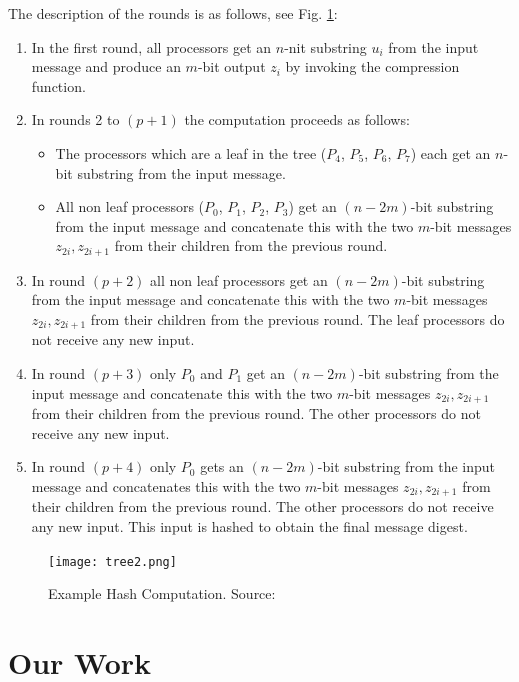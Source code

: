 \documentclass[letterpaper]{article}
\begin{document}
The description of the rounds is as follows, see Fig. \ref{fig:tree2}:
\begin{enumerate}
\item In the first round, all processors get an $n$-nit substring $u_i$ from the input message and produce an $m$-bit output $z_i$ by invoking the compression function.
\item In rounds 2 to $(p+1)$ the computation proceeds as follows:
\begin{itemize}
\item The processors which are a leaf in the tree ($P_4$, $P_5$, $P_6$, $P_7$) each get an $n$-bit substring from the input message.
\item All non leaf processors ($P_0$, $P_1$, $P_2$, $P_3$) get an $(n-2m)$-bit substring from the input message and concatenate this with the two $m$-bit messages $z_{2i}, z_{2i+1}$ from their children from the previous round.
\end{itemize}

\item  In round $(p+2)$ all non leaf processors get an  $(n-2m)$-bit substring from the input message and concatenate this with the two $m$-bit messages $z_{2i}, z_{2i+1}$ from their children from the previous round. The leaf processors do not receive any new input.

\item In round $(p+3)$ only $P_0$ and $P_1$ get an  $(n-2m)$-bit substring from the input message and concatenate this with the two $m$-bit messages $z_{2i}, z_{2i+1}$ from their children from the previous round. The other processors do not receive any new input.

\item In round $(p+4)$ only $P_0$ gets an  $(n-2m)$-bit substring from the input message and concatenates this with the two $m$-bit messages $z_{2i}, z_{2i+1}$ from their children from the previous round. The other processors do not receive any new input. This input is hashed to obtain the final message digest.
\end{enumerate}



\begin{figure}[h]
\centering

 \texttt{[image: tree2.png]}


  \caption{Example Hash Computation. Source: \cite{parsha256}}
  \label{fig:tree2}
\end{figure} 

\section{Our Work}\label{sec:yourmethod}
\end{document}
